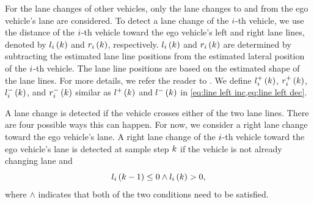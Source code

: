 \cstartc
For the lane changes of other vehicles, only the lane changes to and from the ego vehicle's lane are considered.
To detect a lane change of the $i$-th vehicle, we use the distance of the $i$-th vehicle toward the ego vehicle's left and right lane lines, denoted by $l_{i}\left(k\right)$ and $r_{i}\left(k\right)$, respectively. \cendc
\cstartd $l_{i}\left(k\right)$ and $r_{i}\left(k\right)$ are determined by subtracting the estimated lane line positions from the estimated lateral position of the $i$-th vehicle. 
The lane line positions are based on the estimated shape of the lane lines. 
For more details, we refer the reader to \autocite{elfring2016effective}. \cendd
\cstartc We define $l^{+}_{i}\left(k\right)$, $r^{+}_{i}\left(k\right)$, $l^{-}_{i}\left(k\right)$, and $r^{-}_{i}\left(k\right)$ similar as $l^{+}\left(k\right)$ and $l^{-}\left(k\right)$ in \cref{eq:line left inc,eq:line left dec}.

A lane change is detected if the vehicle crosses either of the two lane lines.
There are four possible ways this can happen.
For now, we consider a right lane change toward the ego vehicle's lane.
A right lane change of the $i$-th vehicle toward the ego vehicle's lane is detected at sample step $k$ if the vehicle is not already changing lane and
\begin{equation}
	\label{eq:detect lane change target}
	l_{i}\left(k-1\right) \leq 0 \land l_{i}\left(k\right) > 0,
\end{equation}
where $\land$ indicates that both of the two conditions need to be satisfied.

